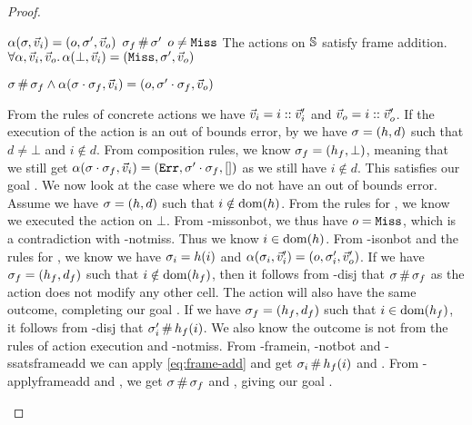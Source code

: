 \begin{proof}

\pfassume \begin{hypvlist}
 $\alpha(\sigma,\vec{v}_i)=(o,\sigma',\vec{v}_o)$
 $\sigma_f\operatorname{\#}\sigma'$
 $o\neq\texttt{Miss}$
 The actions on $\mathbb S$ satisfy frame addition.
 $\forall \alpha, \vec{v}_i, \vec{v}_o\ldotp \alpha(\bot,\vec{v}_i)=(\texttt{Miss},\sigma',\vec{v}_o)$
\end{hypvlist}
\pfprove \begin{goalvlist}
 $\sigma \operatorname{\#} \sigma_f \land \alpha(\sigma\cdot\sigma_f, \vec{v}_i)=(o, \sigma'\cdot\sigma_f, \vec{v}_o)$	
\end{goalvlist}

\pfcase{$\alpha\in\actions_\mmdl$}

\begin{hypvlist}
 From the rules of concrete actions we have $\vec{v}_i=i::\vec{v}_i'$ and $\vec{v}_o=i::\vec{v}_o'$.
 If the execution of the action is an out of bounds error, by  we have $\sigma=(h,d)$ such that $d\neq\bot$ and $i\notin d$.
 From composition rules, we know $\sigma_f=(h_f,\bot)$, meaning that we still get $\\\alpha(\sigma\cdot\sigma_f,\vec{v}_i)=(\texttt{Err},\sigma'\cdot\sigma_f,[])$ as we still have $i\notin d$. This satisfies our goal .
 We now look at the case where we do not have an out of bounds error. Assume we have $\sigma=(h,d)$ such that $i\notin \operatorname{dom}(h)$. From the rules for , we know we executed the action on $\bot$. From \hyp{missonbot}, we thus have $o=\texttt{Miss}$, which is a contradiction with \hyp{notmiss}. Thus we know $i\in \operatorname{dom}(h)$.
 From \hyp{isonbot} and the rules for , we know we have $\sigma_i=h(i)$ and $\alpha(\sigma_i,\vec{v}_i')=(o,\sigma_i',\vec{v}_o')$.
 If we have $\sigma_f=(h_f,d_f)$ such that $i\notin \operatorname{dom}(h_f)$, then it follows from \hyp{disj} that $\sigma\operatorname{\#}\sigma_f$ as the action does not modify any other cell. The action will also have the same outcome, completing our goal .
 If we have $\sigma_f=(h_f,d_f)$ such that $i\in\operatorname{dom}(h_f)$, it follows from \hyp{disj} that $\sigma_i'\operatorname{\#} h_f(i)$. We also know the outcome is not \Miss{} from the rules of action execution and \hyp{notmiss}.
 From \hyp{framein}, \hyp{notbot} and \hyp{ssatsframeadd} we can apply \ref{eq:frame-add} and get $\sigma_i\operatorname{\#} h_f(i)$ and .
 From \hyp{applyframeadd} and , we get $\sigma\operatorname{\#}\sigma_f$ and , giving our goal .
\end{hypvlist}


\end{proof}
